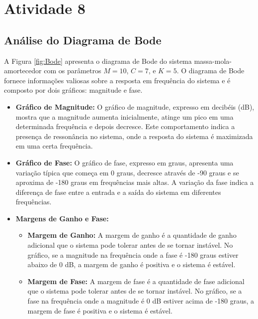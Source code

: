\section{Atividade 8}

\subsection{Análise do Diagrama de Bode}

A Figura \ref{fig:Bode} apresenta o diagrama de Bode do sistema massa-mola-amortecedor com os parâmetros \(M = 10\), \(C = 7\), e \(K = 5\). O diagrama de Bode fornece informações valiosas sobre a resposta em frequência do sistema e é composto por dois gráficos: magnitude e fase.

\begin{itemize}
    \item \textbf{Gráfico de Magnitude:}
          O gráfico de magnitude, expresso em decibéis (dB), mostra que a magnitude aumenta inicialmente, atinge um pico em uma determinada frequência e depois decresce. Este comportamento indica a presença de ressonância no sistema, onde a resposta do sistema é maximizada em uma certa frequência.

    \item \textbf{Gráfico de Fase:}
          O gráfico de fase, expresso em graus, apresenta uma variação típica que começa em 0 graus, decresce através de -90 graus e se aproxima de -180 graus em frequências mais altas. A variação da fase indica a diferença de fase entre a entrada e a saída do sistema em diferentes frequências.

    \item \textbf{Margens de Ganho e Fase:}
          \begin{itemize}
              \item \textbf{Margem de Ganho:} A margem de ganho é a quantidade de ganho adicional que o sistema pode tolerar antes de se tornar instável. No gráfico, se a magnitude na frequência onde a fase é -180 graus estiver abaixo de 0 dB, a margem de ganho é positiva e o sistema é estável.
              \item \textbf{Margem de Fase:} A margem de fase é a quantidade de fase adicional que o sistema pode tolerar antes de se tornar instável. No gráfico, se a fase na frequência onde a magnitude é 0 dB estiver acima de -180 graus, a margem de fase é positiva e o sistema é estável.
          \end{itemize}
\end{itemize}

